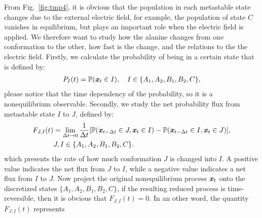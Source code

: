 \documentclass[aip,jcp,a4paper,preprint,onecolumn]{revtex4-1}
\newcommand{\vect}[1]{\textbf{\textit{#1}}}
\newcommand{\fwd}[0]{\textrm{fwd}}
\newcommand{\bwd}[0]{\textrm{bwd}}
\begin{document}
From Fig.~\ref{fig:tmp4}, it is obvious that the population in each
metastable state changes due to the external electric field, for
example, the population of state $C$ vanishes in equilibrium,
but plays an important role when the electric field is applied. We
therefore want to study how the alanine changes from one conformation
to the other, how fast is the change, and the relations to the 
the electric field. 
Firstly, we calculate the probability of being in a certain state that
is defined by:
\begin{align}
  P_I(t) = \mathbb P (\vect x_t \in I), \quad  I \in \{A_1, A_2, B_1, B_2, C\},
\end{align}
please notice that the time dependency of the probability, so it is
a nonequilibrium observable.
Secondly,
we study the net probability flux from metastable state $I$ to $J$, defined by:
\begin{align}\nonumber
  F_{J,I}(t) & =\lim_{\Delta t\rightarrow 0} \frac1{\Delta t} [\mathbb P( \vect x_{t-\Delta t} \in J, \vect x_t \in I) - \mathbb P( \vect x_{t-\Delta t} \in I, \vect x_t \in J)], \\\label{eqn:tmp7}
  & J,I \in \{A_1, A_2, B_1, B_2, C\}.
\end{align}
which presents the rate of how much conformation $J$ is changed
into $I$. A positive value indicates the
net flux from $J$ to $I$,
while a negative value indicates a net flux from $I$ to $J$.
Now project the original nonequilibrium process $\vect x_t$
onto the discretized states $\{A_1, A_2, B_1, B_2, C\}$,
if the resulting reduced process 
is time-reversible, then it is obvious that
$ F_{J,I}(t) = 0$. In an other word, the quantity $ F_{J,I}(t) $ represents
\end{document}
